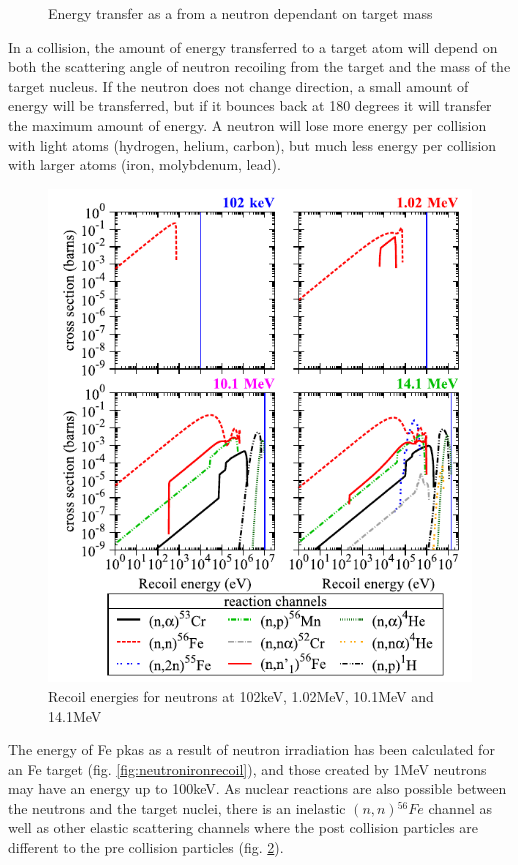 \begin{figure}
\begin{minipage}{.46\textwidth}
\caption{Energy transfer as a from a neutron dependant on target mass}
\label{fig:energytransfer}
\end{minipage}
\end{figure}

In a collision, the amount of energy transferred to a target atom will depend on both the scattering angle of neutron recoiling from the target and the mass of the target nucleus.  If the neutron does not change direction, a small amount of energy will be transferred, but if it bounces back at 180 degrees it will transfer the maximum amount of energy.  A neutron will lose more energy per collision with light atoms (hydrogen, helium, carbon), but much less energy per collision with larger atoms (iron, molybdenum, lead).

\begin{figure}[h]
  \begin{center}
    \includegraphics[width=.65\linewidth]{chapters/background_austenitic_steels_in_nuclear/images/neutronrecoils.png}
    \caption{Recoil energies for neutrons at 102keV, 1.02MeV, 10.1MeV and 14.1MeV\cite{pkaenergyspectra}}
    \label{fig:ferecoilchannels}
  \end{center}
\end{figure}
\FloatBarrier


The energy of Fe \acrshort{pka}s as a result of neutron irradiation has been calculated for an Fe target\cite{pkaenergyspectra} (fig. \ref{fig:neutronironrecoil}), and those created by 1MeV neutrons may have an energy up to 100keV.  As nuclear reactions are also possible between the neutrons and the target nuclei, there is an inelastic $(n,n) {}^{56}Fe$ channel as well as other elastic scattering channels where the post collision particles are different to the pre collision particles (fig. \ref{fig:ferecoilchannels}).






